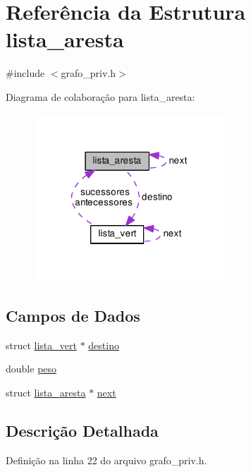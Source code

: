 \hypertarget{structlista__aresta}{}\section{Referência da Estrutura lista\+\_\+aresta}
\label{structlista__aresta}


{\ttfamily \#include $<$grafo\+\_\+priv.\+h$>$}



Diagrama de colaboração para lista\+\_\+aresta\+:
\nopagebreak
\begin{figure}[H]
\begin{center}
\leavevmode
\includegraphics[width=203pt]{structlista__aresta__coll__graph}
\end{center}
\end{figure}
\subsection*{Campos de Dados}
\begin{DoxyCompactItemize}
\item 
struct \hyperlink{structlista__vert}{lista\+\_\+vert} $\ast$ \hyperlink{structlista__aresta_a324d065ab2fc1df5d59128027c4c8a5a}{destino}
\item 
double \hyperlink{structlista__aresta_af006bc606a812d12d13d35a4f00c0e6c}{peso}
\item 
struct \hyperlink{structlista__aresta}{lista\+\_\+aresta} $\ast$ \hyperlink{structlista__aresta_a55d9a8d5fcc901c1d8802239735b4af7}{next}
\end{DoxyCompactItemize}


\subsection{Descrição Detalhada}


Definição na linha 22 do arquivo grafo\+\_\+priv.\+h.



